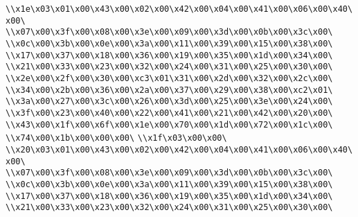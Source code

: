 \verb|\\x1e\x03\x01\x00\x43\x00\x02\x00\x42\x00\x04\x00\x41\x00\x06\x00\x40\x00\|\newline
\verb|\\x07\x00\x3f\x00\x08\x00\x3e\x00\x09\x00\x3d\x00\x0b\x00\x3c\x00\|\newline
\verb|\\x0c\x00\x3b\x00\x0e\x00\x3a\x00\x11\x00\x39\x00\x15\x00\x38\x00\|\newline
\verb|\\x17\x00\x37\x00\x18\x00\x36\x00\x19\x00\x35\x00\x1d\x00\x34\x00\|\newline
\verb|\\x21\x00\x33\x00\x23\x00\x32\x00\x24\x00\x31\x00\x25\x00\x30\x00\|\newline
\verb|\\x2e\x00\x2f\x00\x30\x00\xc3\x01\x31\x00\x2d\x00\x32\x00\x2c\x00\|\newline
\verb|\\x34\x00\x2b\x00\x36\x00\x2a\x00\x37\x00\x29\x00\x38\x00\xc2\x01\|\newline
\verb|\\x3a\x00\x27\x00\x3c\x00\x26\x00\x3d\x00\x25\x00\x3e\x00\x24\x00\|\newline
\verb|\\x3f\x00\x23\x00\x40\x00\x22\x00\x41\x00\x21\x00\x42\x00\x20\x00\|\newline
\verb|\\x43\x00\x1f\x00\x6f\x00\x1e\x00\x70\x00\x1d\x00\x72\x00\x1c\x00\|\newline
\verb|\\x74\x00\x1b\x00\x00\x00\|\newline
\verb|\\x1f\x03\x00\x00\|\newline
\verb|\\x20\x03\x01\x00\x43\x00\x02\x00\x42\x00\x04\x00\x41\x00\x06\x00\x40\x00\|\newline
\verb|\\x07\x00\x3f\x00\x08\x00\x3e\x00\x09\x00\x3d\x00\x0b\x00\x3c\x00\|\newline
\verb|\\x0c\x00\x3b\x00\x0e\x00\x3a\x00\x11\x00\x39\x00\x15\x00\x38\x00\|\newline
\verb|\\x17\x00\x37\x00\x18\x00\x36\x00\x19\x00\x35\x00\x1d\x00\x34\x00\|\newline
\verb|\\x21\x00\x33\x00\x23\x00\x32\x00\x24\x00\x31\x00\x25\x00\x30\x00\|\newline
